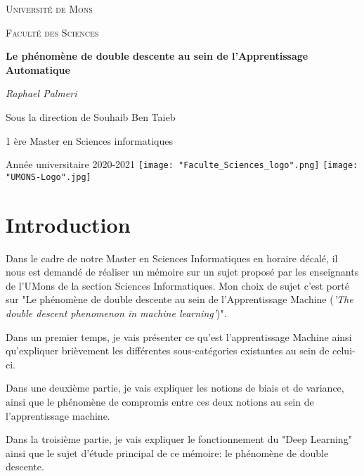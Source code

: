 \documentclass[a4paper]{article}
\author{Raphael Palmeri\\1 ère Master en Sciences Informatiques\\ 2020-2021}
\begin{document}
\begin{titlepage}
	\centering
	{\scshape\LARGE Université de Mons \par}
	\vspace{1cm}
	{\scshape\large Faculté des Sciences \par}
	\vspace{1.5cm}
	{\huge\bfseries Le phénomène de double descente au sein de l'Apprentissage Automatique \par}
	\vspace{2cm}
	{\Large\itshape Raphael Palmeri \par}
	\vspace{2.5cm}
	{Sous la direction de Souhaib Ben Taieb \par}
	\vspace{1.5cm}
	{1 ère Master en Sciences informatiques \par}
	\vspace{5cm}
	Année universitaire 2020-2021
	\vfill
	\texttt{[image: "Faculte\_Sciences\_logo".png]}
	\hfill
	\texttt{[image: "UMONS-Logo".jpg]}
\end{titlepage}
\newpage
\thispagestyle{empty}
\mbox{}
\newpage

\tableofcontents
\newpage

\section{Introduction}
Dans le cadre de notre Master en Sciences Informatiques en horaire décalé, il nous est demandé de réaliser un mémoire sur un sujet proposé par les enseignants de l'UMons de la section Sciences Informatiques. Mon choix de sujet c'est porté sur "Le phénomène de double descente au sein de l'Apprentissage Machine (\textit{'The double descent phenomenon in machine learning'})".\newline

Dans un premier temps, je vais présenter ce qu'est l'apprentissage Machine ainsi qu'expliquer brièvement les différentes sous-catégories existantes au sein de celui-ci. \newline

Dans une deuxième partie, je vais expliquer les notions de biais et de variance, ainsi que le phénomène de compromis entre ces deux notions au sein de l'apprentissage machine. \newline

Dans la troisième partie, je vais expliquer le fonctionnement du "Deep Learning" ainsi que le sujet d'étude principal de ce mémoire: le phénomène de double descente. \newline
\end{document}
